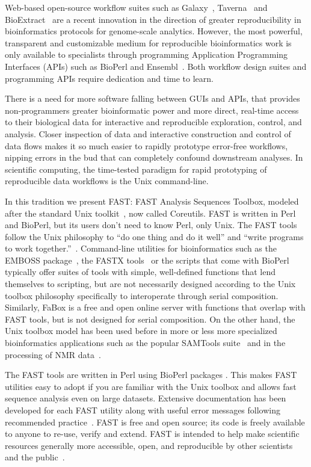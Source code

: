 \documentclass{frontiersSCNS} %
\begin{document}
Web-based open-source workflow suites such as Galaxy~\citep{galaxy14},
Taverna~\citep{CPE:CPE993} and BioExtract~\citep{Lushbough01072011}
are a recent innovation in the direction of greater reproducibility in
bioinformatics protocols for genome-scale analytics. However, the most
powerful, transparent and customizable medium for reproducible
bioinformatics work is only available to specialists through
programming Application Programming Interfaces (APIs) such as BioPerl
and Ensembl~\citep{Yates01012015}. Both workflow design suites and
programming APIs require dedication and time to learn.

There is a need for more software falling between GUIs and APIs, that
provides non-programmers greater bioinformatic power and more direct,
real-time access to their biological data for interactive and
reproducible exploration, control, and analysis. Closer inspection of
data and interactive construction and control of data flows makes it
so much easier to rapidly prototype error-free workflows, nipping
errors in the bud that can completely confound downstream analyses.
In scientific computing, the time-tested paradigm for rapid prototyping
of reproducible data workflows is the Unix command-line.

In this tradition we present FAST: FAST Analysis Sequences Toolbox,
modeled after the standard Unix toolkit~\citep{Peek2001}, now called
Coreutils. FAST is written in Perl and BioPerl, but its users don't
need to know Perl, only Unix. The FAST tools follow the Unix philosophy to ``do one thing
and do it well'' and ``write programs to work
together.''~\citep{Stutz2000}. Command-line utilities for
bioinformatics such as the EMBOSS package~\citep{Rice2000}, the FASTX
tools~\citep{fastx} or the scripts that come with
BioPerl~\citep{Stajich2002} typically offer suites of tools with
simple, well-defined functions that lend themselves to scripting, but
are not necessarily designed according to the Unix toolbox philosophy
specifically to interoperate through serial composition. Similarly,
FaBox is a free and open online server with functions that overlap
with FAST tools, but is not designed for serial composition. On the
other hand, the Unix toolbox model has been used before in more or
less more specialized bioinformatics applications such as the popular
SAMTools suite~\citep{Li15082009} and in the processing of NMR
data~\citep{delaglio1995nmrpipe}.

The FAST tools are written in Perl using BioPerl packages
\citep{Stajich2002}. This makes FAST utilities easy to adopt if you
are familiar with the Unix toolbox and allows fast sequence analysis
even on large datasets. Extensive documentation has been developed for
each FAST utility along with useful error messages following
recommended practice~\citep{Seemann2013}. FAST is free and open
source; its code is freely available to anyone to re-use, verify and
extend. FAST is intended to help make scientific resources generally
more accessible, open, and reproducible by other scientists and the
public~\citep{Groves2012}.
\end{document}
